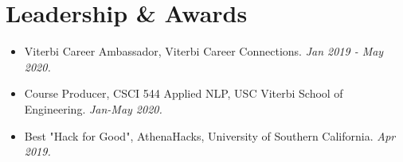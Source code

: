 \documentclass[letterpaper,10pt]{article}
\newcommand{\activity}[2]{
    \item #1 \emph{#2}
}
\newcommand{\bulletsBegin}{
    \vspace{1pt}
    \begin{minipage}{17.6cm}
    \begin{itemize}[leftmargin=0.6cm]
    \setlength\itemsep{-0.1em}
}
\newcommand{\bulletsEnd}{
    \end{itemize}\vspace{0pt}
    \end{minipage}
}
\begin{document}
    \section{Leadership \& Awards}

    \bulletsBegin
        \activity{Viterbi Career Ambassador, Viterbi Career Connections.}
        {Jan 2019 - May 2020.}
        \vspace{-3pt}
        \activity{Course Producer, CSCI 544 Applied NLP, USC Viterbi School of Engineering.}
        {Jan-May 2020.}
        \vspace{-3pt}
        \activity{Best "Hack for Good", AthenaHacks, University of Southern California.}
        {Apr 2019.}
        \vspace{-2pt}
    \bulletsEnd

\end{document}
